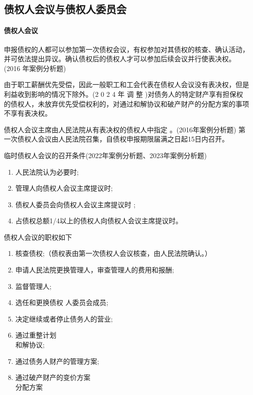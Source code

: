 \documentclass[UTF8,12pt]{ctexart}
\numberwithin{equation}{section} %
\numberwithin{figure}{section}
\numberwithin{table}{section}
\begin{document}
	
	\subsection{债权人会议与债权人委员会}
	\paragraph{债权人会议}
	申报债权的人都可以参加第一次债权会议，有权参加对其债权的核查、确认活动，并可依法提出异议。确认债权后的债权人才可以参加后续会议并行使表决权。(2016 年案例分析题)

	由于职工薪酬优先受偿，因此一般职工和工会代表在债权人会议没有表决权，但是利益收到影响的情况下除外。(2 0 2 4 年 调 整 )对债务人的特定财产享有担保权的债权人，未放弃优先受偿权利的，对通过和解协议和破产财产的分配方案的事项不享有表决权。
	
	债权人会议主席由人民法院从有表决权的债权人中指定 。(2016年案例分析题) 第一次债权人会议由人民法院召集，自债权申报期限届满之日起15日内召开。 
	
	临时债权人会议的召开条件(2022年案例分析题、2023年案例分析题)
	\begin{enumerate}
		\item 人民法院认为必要时;
		
		\item 管理人向债权人会议主席提议时;
		
		\item 债权人委员会向债权人会议主席提议时 ;
		
		\item  占债权总额1/4以上的债权人向债权人会议主席提议时。
	\end{enumerate}
	
	
	债权人会议的职权如下
	\begin{enumerate}
		\item 核查债权;（债权表由第一次债权人会议核查，由人民法院确认。）
		
		\item 申请人民法院更换管理人，审查管理人的费用和报酬;
		
		\item 监督管理人;
		
		\item 选任和更换债权 人委员会成员;
		
		\item 决定继续或者停止债务人的营业;
		
		\item 通过重整计划\\和解协议;
		
		\item 通过债务人财产的管理方案;
		
		\item 通过破产财产的变价方案\\分配方案
	\end{enumerate}
	
\end{document}
